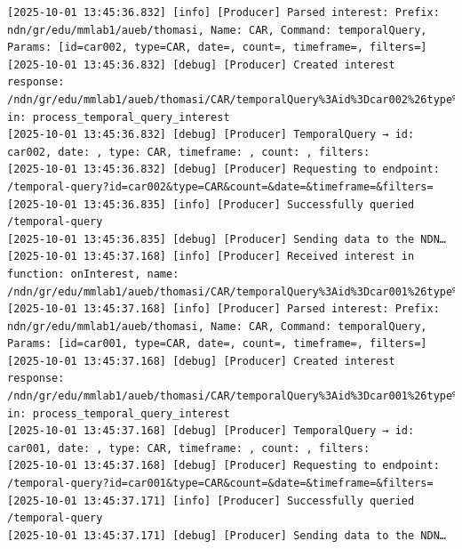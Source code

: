 \documentclass{article}
\begin{document}
\begin{lstlisting}[language=log, caption={Producer logs after receiving \emph{GET by TYPE} from the \emph{UMemphis} node.}, label={lst:after-receiving-get-by-type-umemphis}]
[2025-10-01 13:45:36.832] [info] [Producer] Parsed interest: Prefix: ndn/gr/edu/mmlab1/aueb/thomasi, Name: CAR, Command: temporalQuery, Params: [id=car002, type=CAR, date=, count=, timeframe=, filters=]
[2025-10-01 13:45:36.832] [debug] [Producer] Created interest response: /ndn/gr/edu/mmlab1/aueb/thomasi/CAR/temporalQuery%3Aid%3Dcar002%26type%3DCAR%26date%3D%26count%3D%26timeframe%3D%26filters%3D in: process_temporal_query_interest
[2025-10-01 13:45:36.832] [debug] [Producer] TemporalQuery → id: car002, date: , type: CAR, timeframe: , count: , filters: 
[2025-10-01 13:45:36.832] [debug] [Producer] Requesting to endpoint: /temporal-query?id=car002&type=CAR&count=&date=&timeframe=&filters=
[2025-10-01 13:45:36.835] [info] [Producer] Successfully queried /temporal-query
[2025-10-01 13:45:36.835] [debug] [Producer] Sending data to the NDN…
[2025-10-01 13:45:37.168] [info] [Producer] Received interest in function: onInterest, name: /ndn/gr/edu/mmlab1/aueb/thomasi/CAR/temporalQuery%3Aid%3Dcar001%26type%3DCAR%26date%3D%26count%3D%26timeframe%3D%26filters%3D
[2025-10-01 13:45:37.168] [info] [Producer] Parsed interest: Prefix: ndn/gr/edu/mmlab1/aueb/thomasi, Name: CAR, Command: temporalQuery, Params: [id=car001, type=CAR, date=, count=, timeframe=, filters=]
[2025-10-01 13:45:37.168] [debug] [Producer] Created interest response: /ndn/gr/edu/mmlab1/aueb/thomasi/CAR/temporalQuery%3Aid%3Dcar001%26type%3DCAR%26date%3D%26count%3D%26timeframe%3D%26filters%3D in: process_temporal_query_interest
[2025-10-01 13:45:37.168] [debug] [Producer] TemporalQuery → id: car001, date: , type: CAR, timeframe: , count: , filters: 
[2025-10-01 13:45:37.168] [debug] [Producer] Requesting to endpoint: /temporal-query?id=car001&type=CAR&count=&date=&timeframe=&filters=
[2025-10-01 13:45:37.171] [info] [Producer] Successfully queried /temporal-query
[2025-10-01 13:45:37.171] [debug] [Producer] Sending data to the NDN…
\end{lstlisting}
\end{document}
